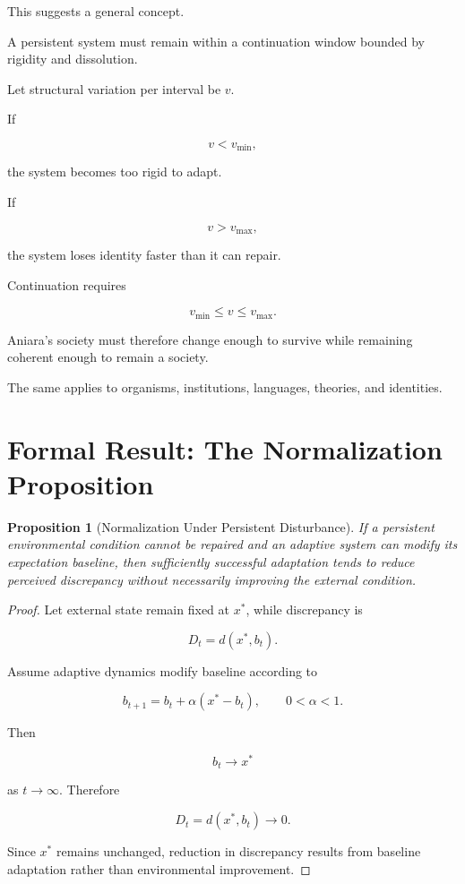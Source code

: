 \documentclass[11pt,oneside]{book}
\newtheorem{proposition}[theorem]{Proposition}
\theoremstyle{definition}
\theoremstyle{remark}
\begin{document}
This suggests a general concept.

A persistent system must remain within a continuation window bounded by rigidity and dissolution.

Let structural variation per interval be \(v\).

If

\[
v<v_{\min},
\]

the system becomes too rigid to adapt.

If

\[
v>v_{\max},
\]

the system loses identity faster than it can repair.

Continuation requires

\[
v_{\min}
\leq
v
\leq
v_{\max}.
\]

Aniara's society must therefore change enough to survive while remaining coherent enough to remain a society.

The same applies to organisms, institutions, languages, theories, and identities.

\section{Formal Result: The Normalization Proposition}

\begin{proposition}[Normalization Under Persistent Disturbance]
If a persistent environmental condition cannot be repaired and an adaptive system can modify its expectation baseline, then sufficiently successful adaptation tends to reduce perceived discrepancy without necessarily improving the external condition.
\end{proposition}

\begin{proof}
Let external state remain fixed at \(x^\ast\), while discrepancy is

\[
D_t=d(x^\ast,b_t).
\]

Assume adaptive dynamics modify baseline according to

\[
b_{t+1}
=
b_t+\alpha(x^\ast-b_t),
\qquad
0<\alpha<1.
\]

Then

\[
b_t\rightarrow x^\ast
\]

as \(t\rightarrow\infty\). Therefore

\[
D_t=d(x^\ast,b_t)\rightarrow0.
\]

Since \(x^\ast\) remains unchanged, reduction in discrepancy results from baseline adaptation rather than environmental improvement.
\end{proof}
\end{document}
